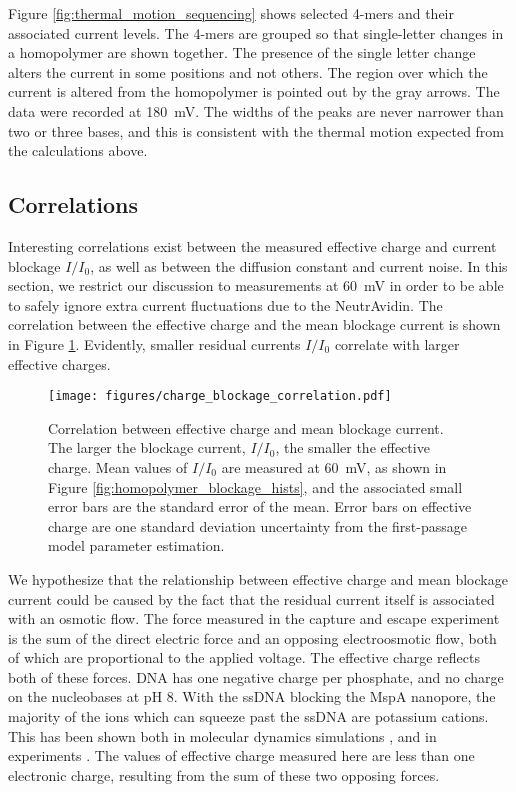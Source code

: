 Figure \ref{fig:thermal_motion_sequencing} shows selected 4-mers and their associated current levels.  The 4-mers are grouped so that single-letter changes in a homopolymer are shown together.  The presence of the single letter change alters the current in some positions and not others.  The region over which the current is altered from the homopolymer is pointed out by the gray arrows.  The data were recorded at \SI{180}{\mV}.  The widths of the peaks are never narrower than two or three bases, and this is consistent with the thermal motion expected from the calculations above.

\subsection{Correlations}

Interesting correlations exist between the measured effective charge and current blockage $I/I_0$, as well as between the diffusion constant and current noise.  In this section, we restrict our discussion to measurements at \SI{60}{\mV} in order to be able to safely ignore extra current fluctuations due to the NeutrAvidin.  The correlation between the effective charge and the mean blockage current is shown in Figure \ref{fig:charge_current_correlation}.  Evidently, smaller residual currents $I/I_0$ correlate with larger effective charges.

\begin{figure}[h]
\begin{centering}
\texttt{[image: figures/charge\_blockage\_correlation.pdf]}
\caption[Correlation between effective charge and current]{Correlation between effective charge and mean blockage current.  The larger the blockage current, $I/I_0$, the smaller the effective charge.  Mean values of $I/I_0$ are measured at \SI{60}{\mV}, as shown in Figure \ref{fig:homopolymer_blockage_hists}, and the associated small error bars are the standard error of the mean.  Error bars on effective charge are one standard deviation uncertainty from the first-passage model parameter estimation.}
\label{fig:charge_current_correlation}
\end{centering}
\end{figure}

We hypothesize that the relationship between effective charge and mean blockage current could be caused by the fact that the residual current itself is associated with an osmotic flow.  The force measured in the capture and escape experiment is the sum of the direct electric force and an opposing electroosmotic flow, both of which are proportional to the applied voltage.  The effective charge reflects both of these forces.  DNA has one negative charge per phosphate, and no charge on the nucleobases at pH \num{8}.  With the ssDNA blocking the MspA nanopore, the majority of the ions which can squeeze past the ssDNA are potassium cations.  This has been shown both in molecular dynamics simulations \citep{Bhattacharya2012}, and in experiments \citep{Nova2017}.  The values of effective charge measured here are less than one electronic charge, resulting from the sum of these two opposing forces.

